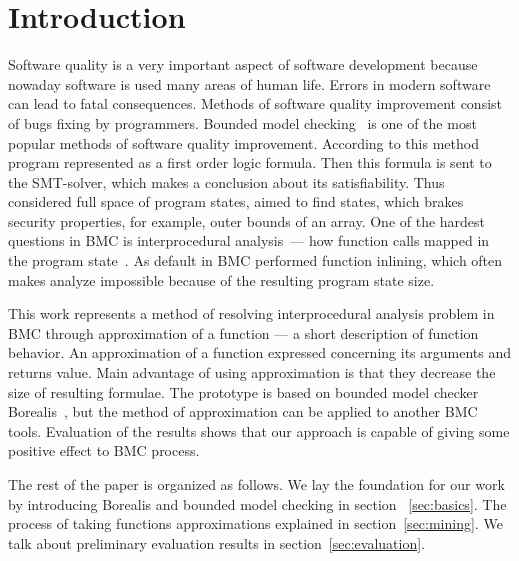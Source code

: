 \section{Introduction}
Software quality is a very important aspect of software development because nowaday software is used many areas of human life. Errors in modern software can lead to fatal consequences. Methods of software quality improvement consist of bugs fixing by programmers. Bounded model checking~\cite{biere2003bounded} is one of the most popular methods of software quality improvement. According to this method program represented as a first order logic formula. Then this formula is sent to the SMT-solver, which makes a conclusion about its satisfiability. Thus considered full space of program states, aimed to find states, which brakes security properties, for example, outer bounds of an array. One of the hardest questions in BMC is interprocedural analysis~--- how function calls mapped in the program state~\cite{InterprocIsHard}. As default in BMC performed function inlining, which often makes analyze impossible because of the resulting program state size.

This work represents a method of resolving interprocedural analysis problem in BMC through approximation of a function --- a short description of function behavior. An approximation of a function expressed concerning its arguments and returns value. Main advantage of using approximation is that they decrease the size of resulting formulae. The prototype is based on bounded model checker Borealis~\cite{Borealis}, but the method of approximation can be applied to another BMC tools. Evaluation of the results shows that our approach is capable of giving some positive effect to BMC process.

The rest of the paper is organized as follows. We lay the foundation for our work by introducing Borealis and bounded model checking in section ~\ref{sec:basics}. The process of taking functions approximations explained in section~\ref{sec:mining}. We talk about preliminary evaluation results in section~\ref{sec:evaluation}.
